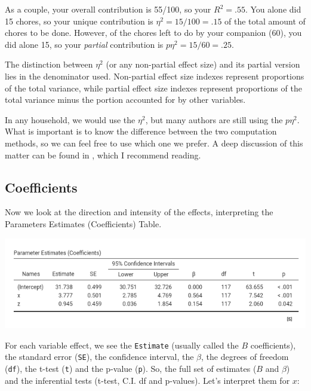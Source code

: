 \documentclass[
]{book}
\begin{document}
As a couple, your overall contribution is 55/100, so your \(R^2=.55\). You alone did 15 chores, so your unique contribution is \(\eta^2=15/100=.15\) of the total amount of chores to be done. However, of the chores left to do by your companion (60), you did alone 15, so your \emph{partial} contribution is \(p\eta^2=15/60=.25\).

The distinction between \(\eta^2\) (or any non-partial effect size) and its partial version lies in the denominator used. Non-partial effect size indexes represent proportions of the total variance, while partial effect size indexes represent proportions of the total variance minus the portion accounted for by other variables.

In any household, we would use the \(\eta^2\), but many authors are still using the \(p\eta^2\). What is important is to know the difference between the two computation methods, so we can feel free to use which one we prefer. A deep discussion of this matter can be found in \citet{olejnik2003generalized}, which I recommend reading.

\hypertarget{coefficients}{%
\subsection{Coefficients}\label{coefficients}}

Now we look at the direction and intensity of the effects, interpreting the {Parameters Estimates (Coefficients)} Table.

\includegraphics[width=0.9\linewidth]{bookletpics/2_output9}

For each variable effect, we see the \texttt{Estimate} (usually called the \(B\) coefficients), the standard error (\texttt{SE}), the confidence interval, the \(\beta\), the degrees of freedom (\texttt{df}), the t-test (\texttt{t}) and the p-value (\texttt{p}). So, the full set of estimates (\(B\) and \(\beta\)) and the inferential tests (t-test, C.I. df and p-values). Let's interpret them for \(x\):
\end{document}

